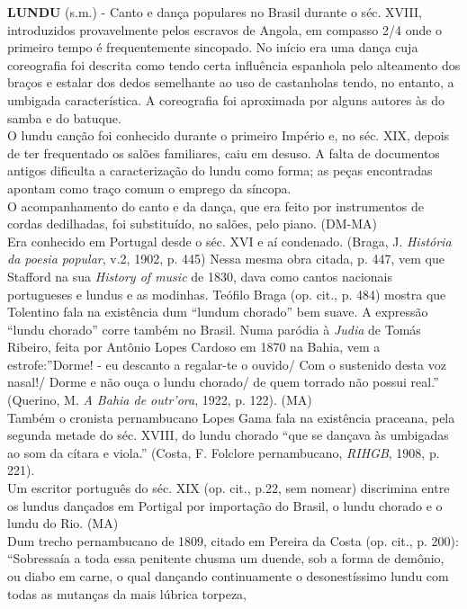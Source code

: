 \textbf{LUNDU} (s.m.) - Canto e dança populares no Brasil durante o séc.
XVIII, introduzidos provavelmente pelos escravos de Angola, em compasso
2/4 onde o primeiro tempo é frequentemente sincopado. No início era uma
dança cuja coreografia foi descrita como tendo certa influência
espanhola pelo alteamento dos braços e estalar dos dedos semelhante ao
uso de castanholas tendo, no entanto, a umbigada característica. A
coreografia foi aproximada por alguns autores às do samba e do
batuque.\\
O lundu canção foi conhecido durante o primeiro Império e, no séc. XIX,
depois de ter frequentado os salões familiares, caiu em desuso. A falta
de documentos antigos dificulta a caracterização do lundu como forma; as
peças encontradas apontam como traço comum o emprego da síncopa.\\
O acompanhamento do canto e da dança, que era feito por instrumentos de
cordas dedilhadas, foi substituído, no salões, pelo piano. (DM-MA)\\
Era conhecido em Portugal desde o séc. XVI e aí condenado. (Braga, J.
\emph{História da poesia popular}, v.2, 1902, p. 445) Nessa mesma obra
citada, p. 447, vem que Stafford na sua \emph{History of music} de 1830,
dava como cantos nacionais portugueses e lundus e as modinhas. Teófilo
Braga (op. cit., p. 484) mostra que Tolentino fala na existência dum
``lundum chorado'' bem suave. A expressão ``lundu chorado'' corre também
no Brasil. Numa paródia à \emph{Judia} de Tomás Ribeiro, feita por
Antônio Lopes Cardoso em 1870 na Bahia, vem a estrofe:''Dorme! - eu
descanto a regalar-te o ouvido/ Com o sustenido desta voz nasal!/ Dorme
e não ouça o lundu chorado/ de quem torrado não possui real.'' (Querino,
M. \emph{A Bahia de outr'ora}, 1922, p. 122). (MA)\\
Também o cronista pernambucano Lopes Gama fala na existência praceana,
pela segunda metade do séc. XVIII, do lundu chorado ``que se dançava às
umbigadas ao som da cítara e viola.'' (Costa, F. Folclore pernambucano,
\emph{RIHGB}, 1908, p. 221).\\
Um escritor português do séc. XIX (op. cit., p.22, sem nomear)
discrimina entre os lundus dançados em Portigal por importação do
Brasil, o lundu chorado e o lundu do Rio. (MA)\\
Dum trecho pernambucano de 1809, citado em Pereira da Costa (op. cit.,
p. 200): ``Sobressaía a toda essa penitente chusma um duende, sob a
forma de demônio, ou diabo em carne, o qual dançando continuamente o
desonestíssimo lundu com todas as mutanças da mais lúbrica torpeza,

